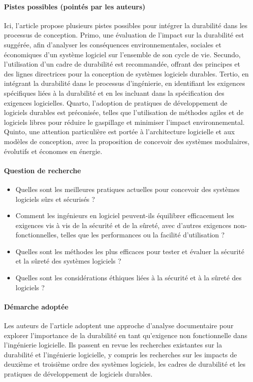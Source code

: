 \paragraph{Pistes possibles (pointés par les auteurs)}
Ici, l'article propose plusieurs pistes possibles pour intégrer la durabilité dans les processus de conception. Primo, une évaluation de l'impact sur la durabilité est suggérée, afin d'analyser les conséquences environnementales, sociales et économiques d'un système logiciel sur l'ensemble de son cycle de vie. Secundo, l'utilisation d'un cadre de durabilité est recommandée, offrant des principes et des lignes directrices pour la conception de systèmes logiciels durables. Tertio, en intégrant la durabilité dans le processus d'ingénierie, en identifiant les exigences spécifiques liées à la durabilité et en les incluant dans la spécification des exigences logicielles. Quarto, l'adoption de pratiques de développement de logiciels durables est préconisée, telles que l'utilisation de méthodes agiles et de logiciels libres pour réduire le gaspillage et minimiser l'impact environnemental. Quinto, une attention particulière est portée à l'architecture logicielle et aux modèles de conception, avec la proposition de concevoir des systèmes modulaires, évolutifs et économes en énergie.

\paragraph{Question de recherche}
\begin{itemize}
    \item Quelles sont les meilleures pratiques actuelles pour concevoir des systèmes logiciels sûrs et sécurisés ?
    \item Comment les ingénieurs en logiciel peuvent-ils équilibrer efficacement les exigences vis à vis de la sécurité et de la sûreté, avec d'autres exigences non-fonctionnelles, telles que les performances ou la facilité d'utilisation ?
    \item Quelles sont les méthodes les plus efficaces pour tester et évaluer la sécurité et la sûreté des systèmes logiciels ?
    \item Quelles sont les considérations éthiques liées à la sécurité et à la sûreté des logiciels ?
\end{itemize}

\paragraph{Démarche adoptée}
Les auteurs de l'article adoptent une approche d'analyse documentaire pour explorer l'importance de la durabilité en tant qu'exigence non fonctionnelle dans l'ingénierie logicielle. Ils passent en revue les recherches existantes sur la durabilité et l'ingénierie logicielle, y compris les recherches sur les impacts de deuxième et troisième ordre des systèmes logiciels, les cadres de durabilité et les pratiques de développement de logiciels durables.

